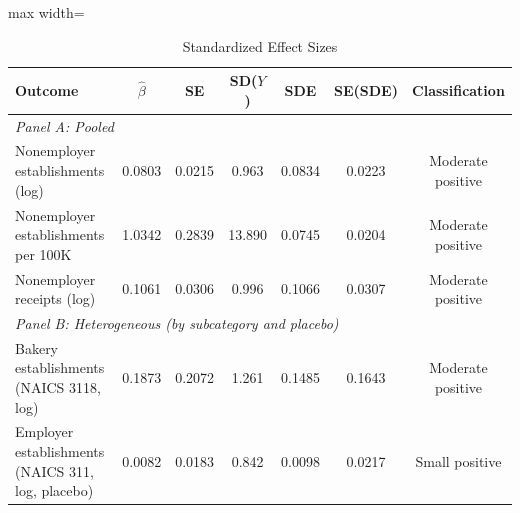 \begin{table}[htbp]
\centering
\caption{Standardized Effect Sizes}
\label{tab:sde}
\begin{adjustbox}{max width=\textwidth}
\begin{tabular}{lcccccc}
\hline\hline
Outcome & $\hat{\beta}$ & SE & SD($Y$) & SDE & SE(SDE) & Classification \\
\hline
\multicolumn{7}{l}{\textit{Panel A: Pooled}} \\
Nonemployer establishments (log) & 0.0803 & 0.0215 & 0.963 & 0.0834 & 0.0223 & Moderate positive \\
Nonemployer establishments per 100K & 1.0342 & 0.2839 & 13.890 & 0.0745 & 0.0204 & Moderate positive \\
Nonemployer receipts (log) & 0.1061 & 0.0306 & 0.996 & 0.1066 & 0.0307 & Moderate positive \\
\hline
\multicolumn{7}{l}{\textit{Panel B: Heterogeneous (by subcategory and placebo)}} \\
Bakery establishments (NAICS 3118, log) & 0.1873 & 0.2072 & 1.261 & 0.1485 & 0.1643 & Moderate positive \\
Employer establishments (NAICS 311, log, placebo) & 0.0082 & 0.0183 & 0.842 & 0.0098 & 0.0217 & Small positive \\
\hline\hline
\end{tabular}
\end{adjustbox}
\begin{tablenotes}[flushleft]\small

\end{tablenotes}
\end{table}
